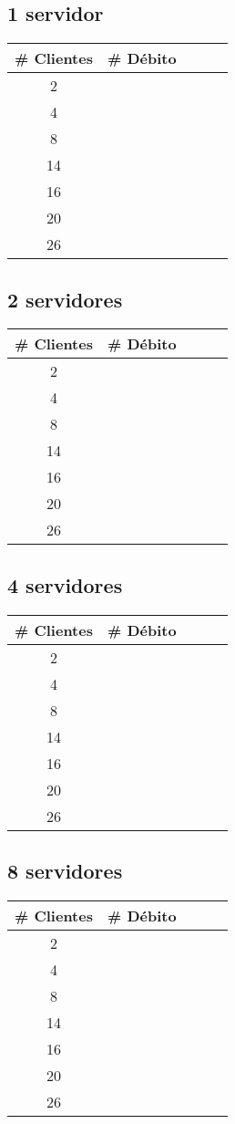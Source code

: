 \subsection{1 servidor}
\begin{tabular}{|c|c|c|c|c|}
\hline
\textbf{\# Clientes} & \textbf{\# Débito} \\ \hline
2 &  \\ \hline
4 &  \\ \hline
8 &  \\ \hline
14 &  \\ \hline
16 &  \\ \hline
20 &  \\ \hline
26 &  \\ \hline
\end{tabular}

\subsection{2 servidores}
\begin{tabular}{|c|c|c|c|c|}
\hline
\textbf{\# Clientes} & \textbf{\# Débito} \\ \hline
2 &  \\ \hline
4 &  \\ \hline
8 &  \\ \hline
14 &  \\ \hline
16 &  \\ \hline
20 &  \\ \hline
26 &  \\ \hline
\end{tabular}

\subsection{4 servidores}
\begin{tabular}{|c|c|c|c|c|}
\hline
\textbf{\# Clientes} & \textbf{\# Débito} \\ \hline
2 &  \\ \hline
4 &  \\ \hline
8 &  \\ \hline
14 &  \\ \hline
16 &  \\ \hline
20 &  \\ \hline
26 &  \\ \hline
\end{tabular}

\subsection{8 servidores}
\begin{tabular}{|c|c|c|c|c|}
\hline
\textbf{\# Clientes} & \textbf{\# Débito} \\ \hline
2 &  \\ \hline
4 &  \\ \hline
8 &  \\ \hline
14 &  \\ \hline
16 &  \\ \hline
20 &  \\ \hline
26 &  \\ \hline
\end{tabular}
